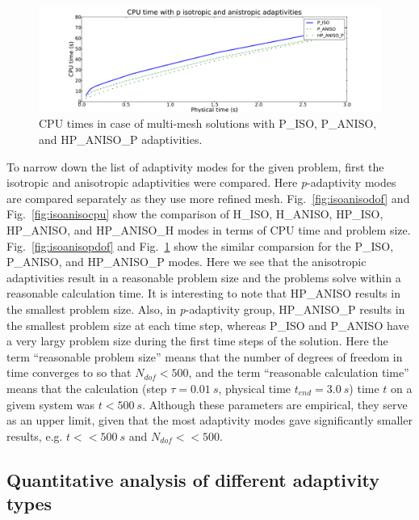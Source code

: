 \begin{figure}
  \begin{centering}
  \includegraphics[width=\columnwidth]{isoanisop_cpu}
  \caption{\label{fig:isoanisopcpu} CPU times in case 
  of multi-mesh solutions with P\_ISO, P\_ANISO, and
  HP\_ANISO\_P adaptivities.}
  \end{centering}
\end{figure}
To narrow down the list of adaptivity modes for the given problem, first the
isotropic and anisotropic adaptivities were compared. Here \emph{p}-adaptivity
modes are compared separately as they use more refined mesh.
Fig.~\ref{fig:isoanisodof} and Fig.~\ref{fig:isoanisocpu} show the comparison
of H\_ISO, H\_ANISO, HP\_ISO, HP\_ANISO, and HP\_ANISO\_H modes in terms of CPU time
and problem size.
Fig.~\ref{fig:isoanisopdof} and Fig.~\ref{fig:isoanisopcpu} show the similar
comparsion for the P\_ISO, P\_ANISO, and HP\_ANISO\_P modes.
Here we see that the anisotropic adaptivities result in a reasonable problem
size and the problems solve within a reasonable calculation time. It is interesting
to note that HP\_ANISO results in the smallest problem size. Also, in
\emph{p}-adaptivity group, HP\_ANISO\_P results in the smallest problem size
at each time step, whereas P\_ISO and P\_ANISO have a very largy problem size
during the first time steps of the solution.
Here the term ``reasonable problem size''
means that the number of degrees of freedom in time converges
to so that $N_{dof}<500$, and the term ``reasonable calculation time''
means that the calculation (step $\tau=0.01\ s$, physical
time $t_{end}=3.0\ s$) time $t$ on a givem system was $t<500\ s$.
Although these parameters are empirical, they serve as an upper limit, given
that the most adaptivity modes gave significantly smaller results,
e.g. $t<<500\ s$ and $N_{dof} << 500$.

\subsection{Quantitative analysis of different adaptivity types}

